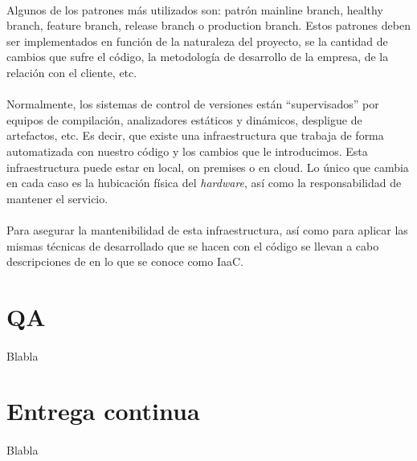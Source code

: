 \paragraph{}Algunos de los patrones más utilizados son: patrón mainline branch, healthy
branch, feature branch, release branch o production branch. Estos patrones deben ser
implementados en función de la naturaleza del proyecto, se la cantidad de cambios que
sufre el código, la metodología de desarrollo de la empresa, de la relación con el
cliente, etc.

\paragraph{}Normalmente, los sistemas de control de versiones están ``supervisados''
por equipos de compilación, analizadores estáticos y dinámicos, despligue de artefactos,
etc. Es decir, que existe una infraestructura que trabaja de forma automatizada con
nuestro código y los cambios que le introducimos. Esta infraestructura puede estar
en local, \gls{on premises} o en cloud. Lo único que cambia en cada caso es la hubicación
física del \emph{hardware}, así como la responsabilidad de mantener el servicio.

\paragraph{}Para asegurar la mantenibilidad de esta infraestructura, así como para aplicar
las mismas técnicas de desarrollado que se hacen con el código se llevan a cabo descripciones
de  en lo que se conoce como \gls{IaaC}.

\section{QA}

\paragraph{}Blabla

\section{Entrega continua}

\paragraph{}Blabla

